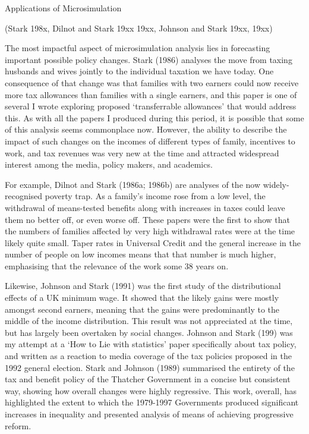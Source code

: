 \documentclass[
  letterpaper,
  DIV=11,
  numbers=noendperiod]{scrartcl}
\begin{document}
Applications of Microsimulation

(Stark 198x, Dilnot and Stark 19xx 19xx, Johnson and Stark 19xx, 19xx)

The most impactful aspect of microsimulation analysis lies in
forecasting important possible policy changes. Stark (1986) analyses the
move from taxing husbands and wives jointly to the individual taxation
we have today. One consequence of that change was that families with two
earners could now receive more tax allowances than families with a
single earners, and this paper is one of several I wrote exploring
proposed `transferrable allowances' that would address this. As with all
the papers I produced during this period, it is possible that some of
this analysis seems commonplace now. However, the ability to describe
the impact of such changes on the incomes of different types of family,
incentives to work, and tax revenues was very new at the time and
attracted widespread interest among the media, policy makers, and
academics.

For example, Dilnot and Stark (1986a; 1986b) are analyses of the now
widely-recognised poverty trap. As a family's income rose from a low
level, the withdrawal of means-tested benefits along with increases in
taxes could leave them no better off, or even worse off. These papers
were the first to show that the numbers of families affected by very
high withdrawal rates were at the time likely quite small. Taper rates
in Universal Credit and the general increase in the number of people on
low incomes means that that number is much higher, emphasising that the
relevance of the work some 38 years on.

Likewise, Johnson and Stark (1991) was the first study of the
distributional effects of a UK minimum wage. It showed that the likely
gains were mostly amongst second earners, meaning that the gains were
predominantly to the middle of the income distribution. This result was
not appreciated at the time, but has largely been overtaken by social
changes. Johnson and Stark (199) was my attempt at a `How to Lie with
statistics' paper specifically about tax policy, and written as a
reaction to media coverage of the tax policies proposed in the 1992
general election. Stark and Johnson (1989) summarised the entirety of
the tax and benefit policy of the Thatcher Government in a concise but
consistent way, showing how overall changes were highly regressive. This
work, overall, has highlighted the extent to which the 1979-1997
Governments produced significant increases in inequality and presented
analysis of means of achieving progressive reform.
\end{document}
